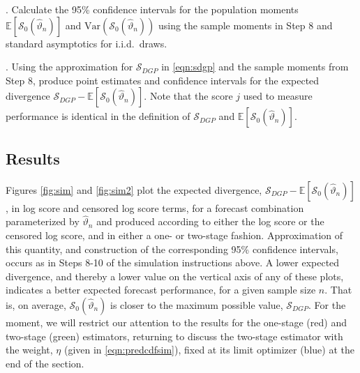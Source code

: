 \documentclass[12pt]{article}
\theoremstyle{definition}
\theoremstyle{remark}
\begin{document}
\medskip

. Calculate the 95\% confidence intervals for the population moments $\mathbb{E}[\mathcal{S}_0(\hat{\vartheta}_n)]$ and $\mathrm{Var}(\mathcal{S}_0(\hat{\vartheta}_n))$ using the sample moments in Step 8 and standard asymptotics for i.i.d.\ draws.

\medskip

. Using the approximation for $\mathcal{S}_{DGP}$ in \eqref{eqn:sdgp} and the sample moments from Step 8, produce point estimates and confidence intervals for the expected divergence $\mathcal{S}_{DGP} - \mathbb{E}[\mathcal{S}_0(\hat{\vartheta}_n)]$. Note that the score $j$ used to measure performance is identical in the definition of $\mathcal{S}_{DGP}$ and $\mathbb{E}[\mathcal{S}_0(\hat{\vartheta}_n)]$.

\subsection{Results}

Figures \ref{fig:sim} and \ref{fig:sim2} plot the expected divergence, $\mathcal{S}_{DGP} - \mathbb{E}[\mathcal{S}_0(\hat{\vartheta}_n)]$, in log score and censored log score terms, for a forecast combination parameterized by $\hat{\vartheta}_n$ and produced according to either the log score or the censored log score, and in either a one- or two-stage fashion. Approximation of this quantity, and construction of the corresponding 95\% confidence intervals, occurs as in Steps 8-10 of the simulation instructions above. A lower expected divergence, and thereby a lower value on the vertical axis of any of these plots, indicates a better expected forecast performance, for a given sample size $n$. That is, on average, $\mathcal{S}_0(\hat{\vartheta}_n)$ is closer to the maximum possible value, $\mathcal{S}_{DGP}$. For the moment, we will restrict our attention to the results for the one-stage (red) and two-stage (green) estimators, returning to discuss the two-stage estimator with the weight, $\eta$ (given in \eqref{eqn:predcdfsim}), fixed at its limit optimizer (blue) at the end of the section.
\end{document}
